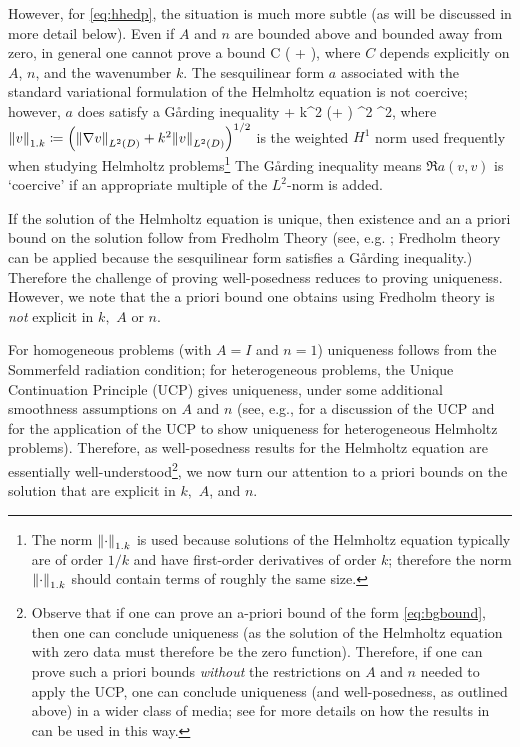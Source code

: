 However, for \eqref{eq:hhedp}, the situation is much more subtle (as will be discussed in more detail below). Even if $A$ and $n$ are bounded above and bounded away from zero, in general one cannot prove a bound
\beq\label{eq:bgbound}
 \leq C \mleft( + \N{\gD}\mright),
\eeq
where $C$ depends explicitly on $A$, $n$, and the wavenumber $k$. The sesquilinear form $a$ associated with the standard variational formulation of the Helmholtz equation is not coercive; however, $a$ does satisfy a G\r{a}rding inequality
\beq\label{eq:gardingbrief}
 + k^2 \mleft(\Amin + \nmax\mright) ^2 \geq \Amin {}^2,
\eeq
where $\NW{v} \de \mleft(\NLtD{\grad v} + k^2 \NLtD{v}\mright)^{1/2}$ is the weighted $H^1$ norm used frequently when studying Helmholtz problems\footnote{The norm $\NW{\cdot}$ is used because solutions of the Helmholtz equation typically are of order $1/k$ and have first-order derivatives of order $k$; therefore the norm $\NW{\cdot}$ should contain terms of roughly the same size.} The G\r{a}rding inequality means $\Re{a(v,v)}$ is `coercive' if an appropriate multiple of the $L^2$-norm is added.

If the solution of the Helmholtz equation is unique, then existence and an a priori bound on the solution follow from Fredholm Theory (see, e.g. \cite[Theorems 5.10 and 5.18]{Sp:15}; Fredholm theory can be applied because the sesquilinear form satisfies a G\r{a}rding inequality.) Therefore the challenge of proving well-posedness reduces to proving uniqueness. However, we note that the a priori bound one obtains using Fredholm theory is \emph{not} explicit in $k,$ $A$ or $n$.

For homogeneous problems (with $A=I$ and $n=1$) uniqueness follows from the Sommerfeld radiation condition; for heterogeneous problems, the Unique Continuation Principle (UCP) gives uniqueness, under some additional smoothness assumptions on $A$ and $n$ (see, e.g., \cite[p. 2871]{GrPeSp:19} for a discussion of the UCP and \cite[Section 2]{GrSa:18} for the application of the UCP to show uniqueness for heterogeneous Helmholtz problems). Therefore, as well-posedness results for the Helmholtz equation are essentially well-understood\footnote{Observe that if one can prove an a-priori bound of the form \eqref{eq:bgbound}, then one can conclude uniqueness (as the solution of the Helmholtz equation with zero data must therefore be the zero function). Therefore, if one can prove such a priori bounds \emph{without} the restrictions on $A$ and $n$ needed to apply the UCP, one can conclude uniqueness (and well-posedness, as outlined above) in a wider class of media; see \cite[pp. 2873, 2883]{GrPeSp:19} for more details on how the results in \cite{GrPeSp:19} can be used in this way.}, we now turn our attention to a priori bounds on the solution that are explicit in $k,$ $A$, and $n.$


